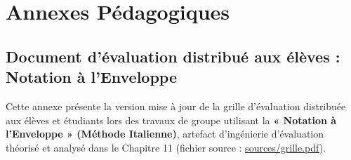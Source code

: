 \chapter{Annexes Pédagogiques}

\section{Document d'évaluation distribué aux élèves : Notation à l'Enveloppe}

Cette annexe présente la version mise à jour de la grille d'évaluation distribuée aux élèves et étudiants lors des travaux de groupe utilisant la \textbf{« Notation à l'Enveloppe » (Méthode Italienne)}, artefact d'ingénierie d'évaluation théorisé et analysé dans le Chapitre 11 (fichier source : \url{sources/grille.pdf}).

\vspace{0.5cm}


